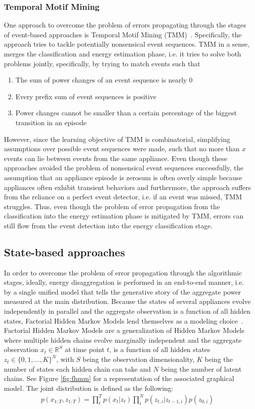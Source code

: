\documentclass[11pt]{cmuthesis} %
\begin{document}
\subsubsection{Temporal Motif Mining}
One approach to overcome the problem of errors propagating through the stages of event-based approaches is Temporal Motif Mining (TMM)~\cite{shao2012temporal}. Specifically, the approach tries to tackle potentially nonsensical event sequences. TMM in a sense, merges the classification and energy estimation phase, i.e. it tries to solve both problems jointly, specifically, by trying to match events such that 
\begin{enumerate}
\item The sum of power changes of an event sequence is nearly 0
\item Every prefix sum of event sequences is positive 
\item Power changes cannot be smaller than a certain percentage of the biggest transition in an episode
\end{enumerate}
However, since the learning objective of TMM is combinatorial, simplifying assumptions over possible event sequences were made, such that no more than $x$ events can lie between events from the same appliance. Even though these approaches avoided the problem of nonsensical event sequences successfully, the assumption that an appliance episode is zerosum is often overly simple because appliances often exhibit transient behaviors and furthermore, the approach suffers from the reliance on a perfect event detector, i.e. if an event was missed, TMM struggles. Thus, even though the problem of error propagation from the classification into the energy estimation phase is mitigated by TMM, errors can still flow from the event detection into the energy classification stage.

\subsection{State-based approaches}
In order to overcome the problem of error propagation through the algorithmic stages, ideally, energy disaggregation is performed in an end-to-end manner, i.e. by a single unified model that tells the generative story of the aggregate power measured at the main distribution. Because the states of several appliances evolve independently in parallel and the aggregate observation is a function of all hidden states, Factorial Hidden Markov Models lend themselves as a modeling choice~\cite{ghahramani1996factorial}. Factorial Hidden Markov Models are a generalization of Hidden Markov Models where multiple hidden chains evolve marginally independent and the aggregate observation $x_t \in \mathbb{R}^S$ at time point $t$, is a function of all hidden states $z_t \in \{0,1, ..., K\}^N$, with $S$ being the observation dimensionality, $K$ being the number of states each hidden chain can take and $N$ being the number of latent chains. See Figure \ref{fig:fhmm} for a representation of the associated graphical model. The joint distribution is defined as the following:
\begin{align}
p(x_{1:T},z_{1:T}) = \prod_t^T p(x_t|z_t)\prod_i^N p(z_{t,i}|z_{t-1,i})p(z_{0,i})
\end{align}
\end{document}
